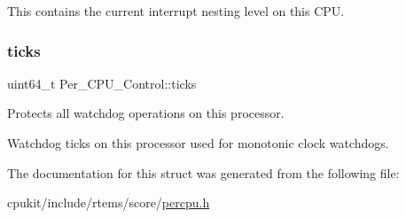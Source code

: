 This contains the current interrupt nesting level on this C\+PU. \mbox{\label{structPer__CPU__Control_abafac09e8013b144149bf2b800797dc6}} 
\subsubsection{\texorpdfstring{ticks}{ticks}}
{\footnotesize\ttfamily uint64\+\_\+t Per\+\_\+\+C\+P\+U\+\_\+\+Control\+::ticks}



Protects all watchdog operations on this processor. 

Watchdog ticks on this processor used for monotonic clock watchdogs. 

The documentation for this struct was generated from the following file\+:\begin{DoxyCompactItemize}
\item 
cpukit/include/rtems/score/\mbox{\hyperlink{score_2percpu_8h}{percpu.\+h}}\end{DoxyCompactItemize}
